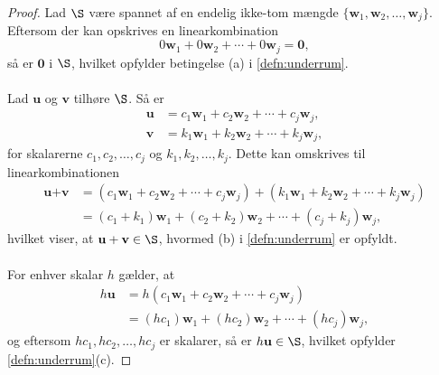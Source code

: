 \begin{proof}
Lad $\S$ være spannet af en endelig ikke-tom mængde 
$\{\textbf{w}_1 , \textbf{w}_2 , \ldots , \textbf{w}_j\}$.
Eftersom der kan opskrives en linearkombination 
$$0\textbf{w}_1 + 0\textbf{w}_2 + \cdots + 0\textbf{w}_j=\textbf{0},$$ 
så er $\textbf{0}$ i  $\S$, hvilket opfylder betingelse (a) i \ref{defn:underrum}.
\\\\
%
Lad $\textbf{u}$ og $\textbf{v}$ tilhøre $\S$. Så er
%
\begin{align*}
\textbf{u}&=c_1\textbf{w}_1+c_2\textbf{w}_2+\cdots+c_j\textbf{w}_j, \\ 
\textbf{v}&=k_1\textbf{w}_1+k_2\textbf{w}_2+\cdots+k_j\textbf{w}_j,
\end{align*}
%
for skalarerne $c_1,c_2,\ldots,c_j$ og $k_1,k_2,\ldots,k_j$. 
Dette kan omskrives til linearkombinationen
%
\begin{align*}
\textbf{u}+\textbf{v}&=(c_1\textbf{w}_1+c_2\textbf{w}_2+\cdots+c_j\textbf{w}_j)+(k_1\textbf{w}_1+k_2\textbf{w}_2+\cdots+k_j\textbf{w}_j)\\
&=(c_1+k_1)\textbf{w}_1+(c_2+k_2)\textbf{w}_2+\cdots+(c_j+k_j)\textbf{w}_j,
\end{align*}
hvilket viser, at $\textbf{u}+\textbf{v}\in \S$, hvormed (b) i \ref{defn:underrum} er opfyldt.
\\\\
For enhver skalar $h$ gælder, at
\begin{align*}
h\textbf{u}&=h(c_1\textbf{w}_1+c_2\textbf{w}_2+\cdots+c_j\textbf{w}_j)\\
&=(hc_1)\textbf{w}_1+(hc_2)\textbf{w}_2+\cdots+(hc_j)\textbf{w}_j,
\end{align*}
og eftersom $hc_1, hc_2, \ldots, hc_j$ er skalarer, så er $h\textbf{u}\in \S$, hvilket opfylder \ref{defn:underrum}(c).
\end{proof}

